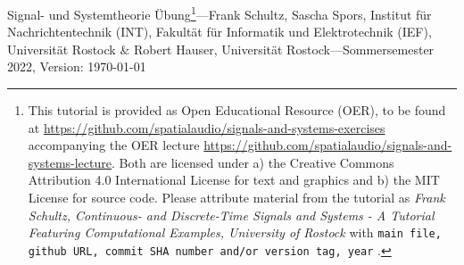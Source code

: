 \documentclass[11pt,a4paper,DIV=12]{scrartcl}
\begin{document}
%
\noindent Signal- und Systemtheorie Übung\footnote{This tutorial is provided as
Open Educational Resource (OER), to be found at
\url{https://github.com/spatialaudio/signals-and-systems-exercises}
accompanying the OER lecture
\url{https://github.com/spatialaudio/signals-and-systems-lecture}.
%
Both are licensed under a) the Creative Commons Attribution 4.0 International
License for text and graphics and b) the MIT License for source code.
%
Please attribute material from the tutorial as \textit{Frank Schultz,
Continuous- and Discrete-Time Signals and Systems - A Tutorial Featuring
Computational Examples, University of Rostock} with
\texttt{main file, github URL, commit SHA number and/or version tag, year}
.}---Frank Schultz, Sascha Spors,
Institut für Nachrichtentechnik (INT),
Fakultät für Informatik und Elektrotechnik (IEF),
Universität Rostock \&
Robert Hauser, Universität Rostock---Sommersemester 2022, Version: \today
%
%
\end{document}
